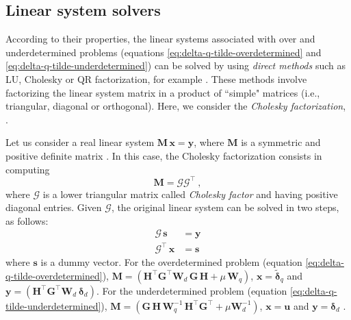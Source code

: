 \subsection{Linear system solvers}
\label{subsec:linear-system-solvers}

According to their properties, the linear systems associated with over and underdetermined problems 
(equations \ref{eq:delta-q-tilde-overdetermined} and \ref{eq:delta-q-tilde-underdetermined}) can be solved 
by using \textit{direct methods} such as LU, Cholesky or QR factorization, for example \citep[][sections 3.2, 4.2 and 5.2]{golub-vanloan2013}.
These methods involve factorizing the linear system matrix in a product of ``simple" matrices 
(i.e., triangular, diagonal or orthogonal). Here, we consider the \textit{Cholesky factorization}, 
\citep[][p. 163]{golub-vanloan2013}.

Let us consider a real linear system $\mathbf{M} \, \mathbf{x} = \mathbf{y}$, where 
$\mathbf{M}$ is a symmetric and positive definite matrix \citep[][p. 159]{golub-vanloan2013}.
In this case, the Cholesky factorization consists in computing 
\begin{equation}
	\mathbf{M} = \boldsymbol{\mathcal{G}} \boldsymbol{\mathcal{G}}^{\top} \: ,
	\label{eq:Cholesky-factorization}
\end{equation}
where $\boldsymbol{\mathcal{G}}$ is a lower triangular matrix called \textit{Cholesky factor} and having positive diagonal entries.
Given $\boldsymbol{\mathcal{G}}$, the original linear system can be solved in two steps, as follows:
\begin{equation}
	\begin{split}
		\boldsymbol{\mathcal{G}} \, \mathbf{s} &= \mathbf{y} \\
		\boldsymbol{\mathcal{G}}^{\top} \, \mathbf{x} &= \mathbf{s}
	\end{split}
	\label{eq:Cholesky-solver}
\end{equation}
where $\mathbf{s}$ is a dummy vector.
For the overdetermined problem (equation \ref{eq:delta-q-tilde-overdetermined}), 
$\mathbf{M} = \left( \mathbf{H}^{\top} \mathbf{G}^{\top} \mathbf{W}_{d} \, \mathbf{G} \, \mathbf{H} + 
\mu \, \mathbf{W}_{q} \right)$, $\mathbf{x} = \tilde{\boldsymbol{\delta}}_{q}$ and
$\mathbf{y} = \left( \mathbf{H}^{\top} \mathbf{G}^{\top} \mathbf{W}_{d} \: \boldsymbol{\delta}_{d} \right)$.
For the underdetermined problem (equation \ref{eq:delta-q-tilde-underdetermined}),
$\mathbf{M} = \left( \mathbf{G} \, \mathbf{H} \, \mathbf{W}_{q}^{-1} \,
\mathbf{H}^{\top}\mathbf{G}^{\top} + \mu \mathbf{W}_{d}^{-1} \right)$, $\mathbf{x} = \mathbf{u}$ and
$\mathbf{y} = \boldsymbol{\delta}_{d}$ .

